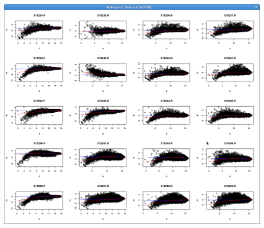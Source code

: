 \documentclass{homework}
\begin{document}
\begin{enumerate}
\includegraphics[scale=0.3]{../data/aufg_37}



\end{enumerate}
\end{document}
